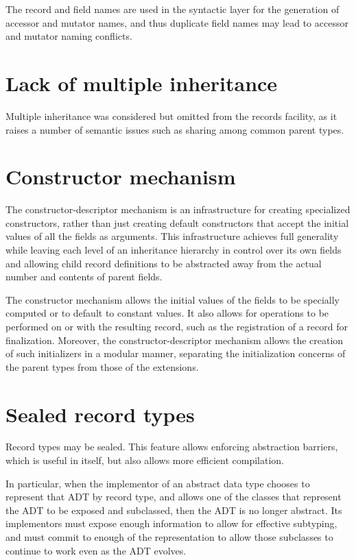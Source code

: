 \documentclass[twoside,twocolumn]{algol60}
\begin{document}
The record and field names are used in the syntactic layer for the
generation of accessor and mutator names, and thus duplicate field names
may lead to accessor and mutator naming conflicts.

\section{Lack of multiple inheritance}

Multiple inheritance was considered but omitted from the records
facility, as it raises a number of semantic issues such as sharing
among common parent types.

\section{Constructor mechanism}

The constructor-descriptor mechanism is an infra\-struc\-ture for
creating specialized constructors, rather than just creating default
constructors that accept the initial values of all the fields as
arguments. This infrastructure achieves full generality while leaving
each level of an inheritance hierarchy in control over its own fields
and allowing child record definitions to be abstracted away from the
actual number and contents of parent fields.

The constructor mechanism allows the initial values of the fields to be specially
computed or to default to constant values. It also allows for
operations to be performed on or with the resulting record, such as
the registration of a record for finalization. Moreover, the
constructor-descriptor mechanism allows the creation of such
initializers in a modular manner, separating the initialization
concerns of the parent types from those of the extensions.

\section{Sealed record types}

Record types may be sealed.  This feature allows enforcing abstraction
barriers, which is useful in itself, but also allows more efficient
compilation.

In particular, when the implementor of an abstract data type chooses
to represent that ADT by record type, and allows one of the classes
that represent the ADT to be exposed and subclassed, then the ADT is
no longer abstract.  Its implementors must expose enough information
to allow for effective subtyping, and must commit to enough of the
representation to allow those subclasses to continue to work even as
the ADT evolves.
\end{document}
